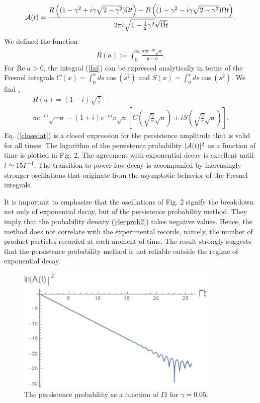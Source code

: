 \documentclass[12pt]{article}
\numberwithin{equation}{section}
\begin{document}
\begin{eqnarray}
{\cal A}(t) = \frac{R\left(  (1- \gamma^2 + i \gamma\sqrt{2-\gamma^2})\Omega t\right) - R\left(  (1- \gamma^2 - i \gamma\sqrt{2-\gamma^2})\Omega t\right)}{2\pi i\sqrt{1 - \frac{1}{2} \gamma^2}\sqrt{\tilde{\Omega t}}}.
\end{eqnarray}
We defined the function
\begin{eqnarray}
R(a) := \int_0^{\infty} \frac{dy e^{-iy}\sqrt{y}} {y - a}. \label{fai}
\end{eqnarray}
For $\mbox{Re} \; a > 0$, the integral (\ref{fai})  can be expressed analytically in terms of the Fresnel integrals $C(x) = \int_0^x ds \cos(s^2)$ and $S(x) =  \int_0^x ds \cos(s^2)$. We find \cite{ASt},
\begin{multline}
R(a) = (1-i) \sqrt{\frac{\pi }{2}}- \\ \pi  e^{-i a} \sqrt{-a}-(1+i)e^{-i a}\pi \sqrt{a}\left[C\left(\sqrt{\frac{2}{\pi }} \sqrt{a}\right)+i  S\left(\sqrt{\frac{2}{\pi }} \sqrt{a}\right)\right]. \label{closedat}
\end{multline}
Eq. (\ref{closedat}) is a closed expression for the persistence amplitude that is valid for all times. The logarithm of the persistence probability $|{\cal A}(t)|^2$ as a function of time is plotted in Fig. 2. The agreement with exponential decay is excellent until $t \simeq 15 \Gamma^{-1}$. The transition to power-law decay is accompanied by increasingly stronger oscillations that originate from the asymptotic behavior of the Fresnel integrals.

It is important to emphasize that the oscillations of Fig. 2 signify the breakdown not only of exponential decay, but of the  persistence probability method. They imply that the probability density (\ref{decprob2}) takes negative values. Hence, the   method does not correlate with the experimental records, namely, the number of product particles recorded at each moment of time. The result strongly suggests that the persistence probability method is not reliable outside the regime of exponential decay.

\begin{figure}
\includegraphics[height=6cm]{per4}
\caption{The persistence probability as a function of $\Gamma t$ for $\gamma = 0.05$. }
\end{figure}
\end{document}

